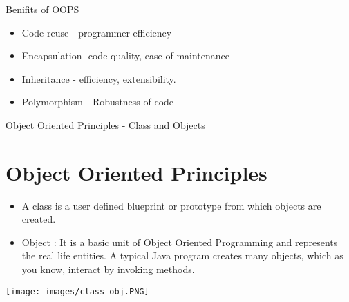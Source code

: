 \documentclass[10pt]{beamer}
\begin{document}
	\begin{frame}{Benifits of OOPS}
		\begin{itemize}
			\item Code reuse - programmer efficiency
			
			\item Encapsulation -code quality, ease of maintenance
			
			\item Inheritance - efficiency, extensibility.
			
			
			\item Polymorphism - Robustness of code
		\end{itemize}
	\end{frame}
		\begin{frame}{Object Oriented Principles - Class and Objects}
			\section{Object Oriented Principles}
			\begin{itemize}
				\item A class is a user defined blueprint or prototype from which objects are created.  
				\item Object : It is a basic unit of Object Oriented Programming and represents the real life entities.  A typical Java program creates many objects, which as you know, interact by invoking methods. 
			\end{itemize}
		\end{frame}
		\begin{frame}
			\centering
			\texttt{[image: images/class\_obj.PNG]}
		\end{frame}
\end{document}

